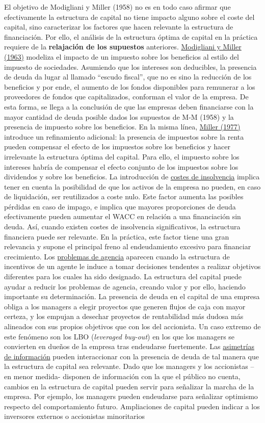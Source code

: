 \documentclass{nuevotema}
\begin{document}
El objetivo de Modigliani y Miller (1958) no es en todo caso afirmar que efectivamente la estructura de capital no tiene impacto alguno sobre el coste del capital, sino caracterizar los factores que hacen relevante la estructura de financiación. Por ello, el análisis de la estructura óptima de capital en la práctica requiere de la \textbf{relajación de los supuestos} anteriores. \underline{Modigliani y Miller (1963)} modeliza el impacto de un impuesto sobre los beneficios al estilo del impuesto de sociedades. Asumiendo que los intereses son deducibles, la presencia de deuda da lugar al llamado ``escudo fiscal'', que no es sino la reducción de los beneficios y por ende, el aumento de los fondos disponibles para remunerar a los proveedores de fondos que capitalizados, conforman el valor de la empresa. De esta forma, se llega a la conclusión de que las empresas deben financiarse con la mayor cantidad de deuda posible dados los supuestos de M-M (1958) y la presencia de impuesto sobre los beneficios. En la misma línea, \underline{Miller (1977)} introduce un refinamiento adicional: la presencia de impuestos sobre la renta pueden compensar el efecto de los impuestos sobre los beneficios y hacer irrelevante la estructura óptima del capital. Para ello, el impuesto sobre los intereses habría de compensar el efecto conjunto de los impuestos sobre los dividendos y sobre los beneficios. La introducción de \underline{costes de insolvencia} implica tener en cuenta la posibilidad de que los activos de la empresa no pueden, en caso de liquidación, ser reutilizados a coste nulo. Este factor aumenta las posibles pérdidas en caso de impago, e implica que mayores proporciones de deuda efectivamente pueden aumentar el WACC en relación a una financiación sin deuda. Así, cuando existen costes de insolvencia significativos, la estructura financiera puede ser relevante. En la práctica, este factor tiene una gran relevancia y supone el principal freno al endeudamiento excesivo para financiar crecimiento. Los \underline{problemas de agencia} aparecen cuando la estructura de incentivos de un agente le induce a tomar decisiones tendentes a realizar objetivos diferentes para los cuales ha sido designado. La estructura del capital puede ayudar a reducir los problemas de agencia, creando valor y por ello, haciendo importante su determinación. La presencia de deuda en el capital de una empresa obliga a los managers a elegir proyectos que generen flujos de caja con mayor certeza, y los empujan a desechar proyectos de rentabilidad más dudosa más alineados con sus propios objetivos que con los del accionista. Un caso extremo de este fenómeno son los LBO (\textit{leveraged buy-out}) en los que los managers se convierten en dueños de la empresa tras endeudarse fuertemente. Las \underline{asimetrías de información} pueden interaccionar con la presencia de deuda de tal manera que la estructura de capital sea relevante. Dado que los managers y los accionistas --en menor medida- disponen de información con la que el público no cuenta, cambios en la estructura de capital pueden servir para señalizar la marcha de la empresa. Por ejemplo, los managers pueden endeudarse para señalizar optimismo respecto del comportamiento futuro. Ampliaciones de capital pueden indicar a los inversores externos o accionistas minoritarios 
\end{document}
